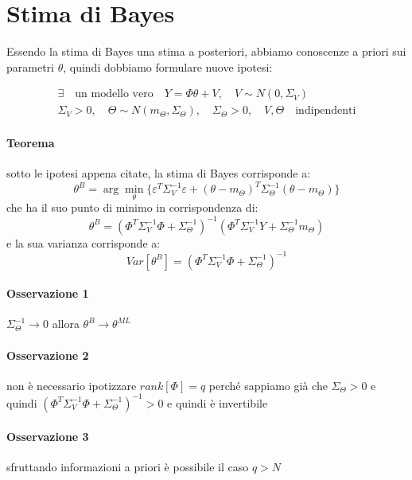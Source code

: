 \section{Stima di Bayes}
Essendo la stima di Bayes una stima a posteriori, abbiamo conoscenze a priori sui parametri $\theta$, quindi dobbiamo formulare nuove ipotesi:

  \begin{gather*}
     \exists \quad \text{un modello vero} \quad Y=\Phi\theta+V, \quad V\sim N(0,\Sigma_V) \\
     \Sigma_V>0,\quad \Theta\sim N(m_\Theta,\Sigma_\Theta),\quad \Sigma_\Theta>0,\quad  V,\Theta \quad \text{indipendenti} 
  \end{gather*}

\paragraph{Teorema} sotto le ipotesi appena citate, la stima di Bayes corrisponde a:
  \[ \theta^B=\arg \min_{\theta} \{ \varepsilon^T\Sigma_V^{-1} \varepsilon + (\theta-m_\Theta)^T\Sigma_\Theta^{-1}(\theta-m_\Theta)\} \]
che ha il suo punto di minimo in corrispondenza di:
  \[ \theta^B=(\Phi^T\Sigma_V^{-1}\Phi+\Sigma_\Theta^{-1})^{-1}(\Phi^T\Sigma_V^{-1}Y+\Sigma_\Theta^{-1}m_\Theta) \]
e la sua varianza corrisponde a:
  \[ Var[\theta^B]=(\Phi^T\Sigma_V^{-1}\Phi+\Sigma_\Theta^{-1})^{-1} \]
\paragraph{Osservazione 1} $\Sigma_\Theta^{-1} \rightarrow 0 $ allora $\theta^B \rightarrow \theta^{ML}$
\paragraph{Osservazione 2} non è necessario ipotizzare $rank[\Phi]=q$ perché sappiamo già che $\Sigma_\Theta>0$ e quindi $(\Phi^T\Sigma_V^{-1}\Phi+\Sigma_\Theta^{-1})^{-1}>0$ e quindi è invertibile
\paragraph{Osservazione 3} sfruttando informazioni a priori è possibile il caso $q>N$

